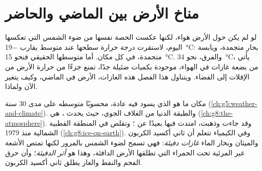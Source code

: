 \chapter{مناخ الأرض بين الماضي والحاضر}\label{ch:g9:climate-past-and-present}

لو لم يكن حول الأرض هواء، لكنها عكست الحصة نفسها من ضوء الشمس التي تعكسها
اليوم، لاستقرت درجة حرارة سطحها عند متوسط يقارب \qty{-19}{\degreeCelsius}:
بحار متجمدة، ويابسة متجمدة، في كل مكان. أما متوسطها الحقيقي فنحو
\qty{15}{\degreeCelsius}. والفرق، نحو \qty{34}{\degreeCelsius}، يأتي من بضعة
غازات في الهواء، موجودة بكميات ضئيلة جدًا، تمنع جزءًا من حرارة الأرض من
الإفلات إلى الفضاء. ويتناول هذا الفصل هذه الغازات،  الأرض في الماضي، وكيف
يتغير الآن ولماذا.

\begin{recall}
 مكان ما هو  الذي يسود فيه عادة، محسوبًا متوسطه على مدى 30 سنة
(\cref{ch:g5:weather-and-climate}). والطبقة الدنيا من الغلاف الجوي، حيث يحدث
، هي  (\cref{ch:g8:the-atmosphere}). وقد جاءت 
وذهبت، امتدت فيها  بعيدًا عن ؛ وتقلص  في
المنطقة القطبية الشمالية منذ 1979 (\cref{ch:g8:ice-on-earth}). وفي الكيمياء
تتعلم أن ثاني أكسيد الكربون والميثان وبخار الماء \emph{غازات دفيئة}: فهي تسمح
لضوء الشمس بالمرور لكنها تمتص الأشعة غير المرئية تحت الحمراء التي تطلقها
الأرض الدافئة، وهذا هو \emph{أثر الدفيئة}؛ وأن حرق الفحم والنفط والغاز يطلق
ثاني أكسيد الكربون.
\end{recall}

